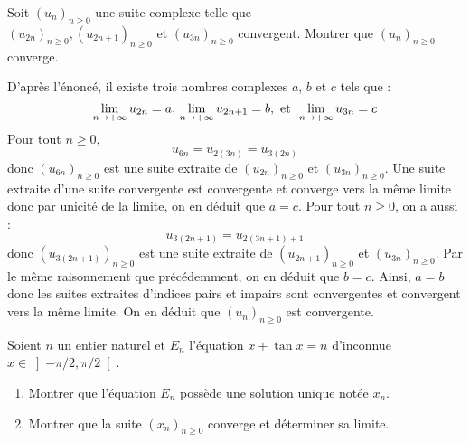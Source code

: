 \documentclass[a4paper,10pt]{report}
\begin{document}
\medskip

\begin{Exercice}{} Soit $(u_n)_{n \geq 0}$ une suite complexe telle que $(u_{2n})_{n \geq 0},(u_{2n + 1})_{n \geq 0}{\text{ et }}(u_{3n})_{n \geq 0}$ convergent. Montrer que $(u_n)_{n \geq 0}$ converge.
\end{Exercice} 

\corr D'après l'énoncé, il existe trois nombres complexes $a$, $b$ et $c$ tels que :
$$ \lim_{n \rightarrow + \infty} u_{2n} = a, \,  \lim_{n \rightarrow + \infty} u_{2n+1} = b,  \hbox{ et } \, \lim_{n \rightarrow + \infty} u_{3n} = c$$
Pour tout $n \geq 0$,
$$ u_{6n} = u_{2(3n)}=u_{3(2n)}$$
donc $(u_{6n})_{n \geq 0}$ est une suite extraite de $(u_{2n})_{n \geq 0}$ et $(u_{3n})_{n \geq 0}$. Une suite extraite d'une suite convergente est convergente et converge vers la même limite donc par unicité de la limite, on en déduit que $a=c$. Pour tout $n \geq 0$, on a aussi :
$$ u_{3(2n+1)}=u_{2(3n+1)+1}$$
donc $(u_{3(2n+1)})_{n \geq 0}$ est une suite extraite de $(u_{2n+1})_{n \geq 0}$ et $(u_{3n})_{n \geq 0}$. Par le même raisonnement que précédemment, on en déduit que $b=c$. Ainsi, $a=b$ donc les suites extraites d'indices pairs et impairs sont convergentes et convergent vers la même limite. On en déduit que $(u_n)_{n \geq 0}$ est convergente. 

\medskip

\begin{Exercice}{} Soient $n$ un entier naturel et $E_n $ l'équation $x + \tan x = n$ d'inconnue $x \in \left] { - \pi  / 2,\pi  / 2} \right[$.

\begin{enumerate}
\item Montrer que l'équation $E_n$ possède une solution unique notée $x_n$.
\item Montrer que la suite $(x_n)_{n \geq 0}$ converge et déterminer sa limite.
\end{enumerate}
\end{Exercice} 

\corr 
\end{document}
